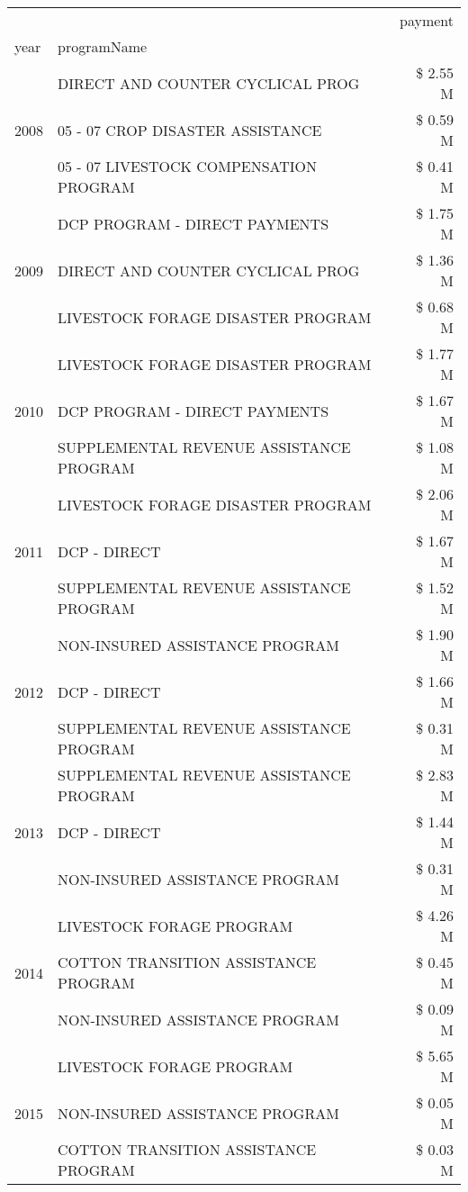 \begin{tabular}{llr}
\toprule
 &  & payment \\
year & programName &  \\
\midrule
\multirow[t]{3}{*}{2008} & DIRECT AND COUNTER CYCLICAL PROG & \$ 2.55 M \\
 & 05 - 07 CROP DISASTER ASSISTANCE & \$ 0.59 M \\
 & 05 - 07 LIVESTOCK COMPENSATION PROGRAM & \$ 0.41 M \\
\cline{1-3}
\multirow[t]{3}{*}{2009} & DCP PROGRAM - DIRECT PAYMENTS & \$ 1.75 M \\
 & DIRECT AND COUNTER CYCLICAL PROG & \$ 1.36 M \\
 & LIVESTOCK FORAGE DISASTER  PROGRAM & \$ 0.68 M \\
\cline{1-3}
\multirow[t]{3}{*}{2010} & LIVESTOCK FORAGE DISASTER  PROGRAM & \$ 1.77 M \\
 & DCP PROGRAM - DIRECT PAYMENTS & \$ 1.67 M \\
 & SUPPLEMENTAL REVENUE ASSISTANCE PROGRAM & \$ 1.08 M \\
\cline{1-3}
\multirow[t]{3}{*}{2011} & LIVESTOCK FORAGE DISASTER PROGRAM & \$ 2.06 M \\
 & DCP - DIRECT & \$ 1.67 M \\
 & SUPPLEMENTAL REVENUE ASSISTANCE PROGRAM & \$ 1.52 M \\
\cline{1-3}
\multirow[t]{3}{*}{2012} & NON-INSURED ASSISTANCE PROGRAM & \$ 1.90 M \\
 & DCP - DIRECT & \$ 1.66 M \\
 & SUPPLEMENTAL REVENUE ASSISTANCE PROGRAM & \$ 0.31 M \\
\cline{1-3}
\multirow[t]{3}{*}{2013} & SUPPLEMENTAL REVENUE ASSISTANCE PROGRAM & \$ 2.83 M \\
 & DCP - DIRECT & \$ 1.44 M \\
 & NON-INSURED ASSISTANCE PROGRAM & \$ 0.31 M \\
\cline{1-3}
\multirow[t]{3}{*}{2014} & LIVESTOCK FORAGE PROGRAM & \$ 4.26 M \\
 & COTTON TRANSITION ASSISTANCE PROGRAM & \$ 0.45 M \\
 & NON-INSURED ASSISTANCE PROGRAM & \$ 0.09 M \\
\cline{1-3}
\multirow[t]{3}{*}{2015} & LIVESTOCK FORAGE PROGRAM & \$ 5.65 M \\
 & NON-INSURED ASSISTANCE PROGRAM & \$ 0.05 M \\
 & COTTON TRANSITION ASSISTANCE PROGRAM & \$ 0.03 M \\

\end{tabular}
